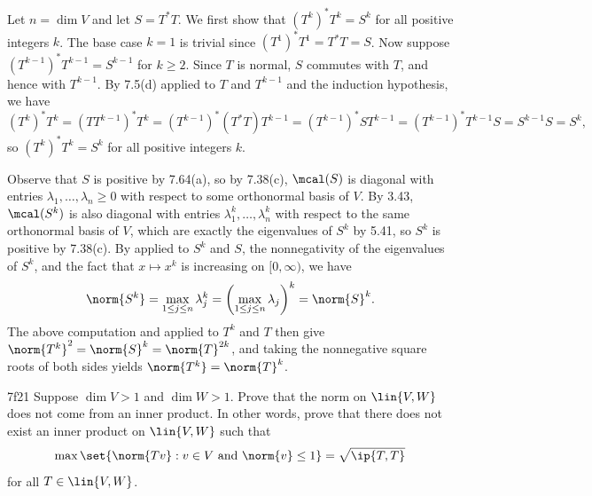 \begin{sol}
    Let $n = \dim V$ and let $S = T^\ast T$.
    We first show that $(T^k)^\ast T^k = S^k$ for all positive integers $k$.
    The base case $k=1$ is trivial since $(T^1)^\ast T^1 = T^\ast T = S$.
    Now suppose $(T^{k-1})^\ast T^{k-1} = S^{k-1}$ for $k \geq 2$.
    Since $T$ is normal, $S$ commutes with $T$, and hence with $T^{k-1}$.
    By 7.5(d) applied to $T$ and $T^{k-1}$ and the induction hypothesis, we have
    \[
        (T^k)^\ast T^k = (TT^{k-1})^\ast T^k = (T^{k-1})^\ast (T^\ast T) T^{k-1} = (T^{k-1})^\ast S T^{k-1} = (T^{k-1})^\ast T^{k-1} S = S^{k-1} S = S^k,
    \]
    so $(T^k)^\ast T^k = S^k$ for all positive integers $k$.

    Observe that $S$ is positive by 7.64(a), so by 7.38(c), $\mcal(S)$ is diagonal with entries $\lambda_1, \ldots, \lambda_n \geq 0$ with respect to some orthonormal basis of $V$.
    By 3.43, $\mcal(S^k)$ is also diagonal with entries $\lambda_1^k, \ldots, \lambda_n^k$ with respect to the same orthonormal basis of $V$, which are exactly the eigenvalues of $S^k$ by 5.41, so $S^k$ is positive by 7.38(c).
    By  applied to $S^k$ and $S$, the nonnegativity of the eigenvalues of $S^k$, and the fact that $x \mapsto x^k$ is increasing on $[0, \infty)$, we have
    \[
        \norm{S^k} = \max_{1 \leq j \leq n} \lambda_j^k = \left(\max_{1 \leq j \leq n} \lambda_j\right)^k = \norm{S}^k.
    \]
    The above computation and  applied to $T^k$ and $T$ then give $\norm{T^k}^2 = \norm{S}^k = \norm{T}^{2k}$, and taking the nonnegative square roots of both sides yields $\norm{T^k} = \norm{T}^k$.
\end{sol}

\begin{exercise}{7f21}
    Suppose $\dim V > 1$ and $\dim W > 1$.
    Prove that the norm on $\lin{V, W}$ does not come from an inner product.
    In other words, prove that there does not exist an inner product on $\lin{V, W}$ such that
    \[
        \max\set{\norm{Tv} : v \in V \text{ and } \norm{v} \leq 1} = \sqrt{\ip{T, T}}
    \]
    for all $T \in \lin{V, W}$.
\end{exercise}


